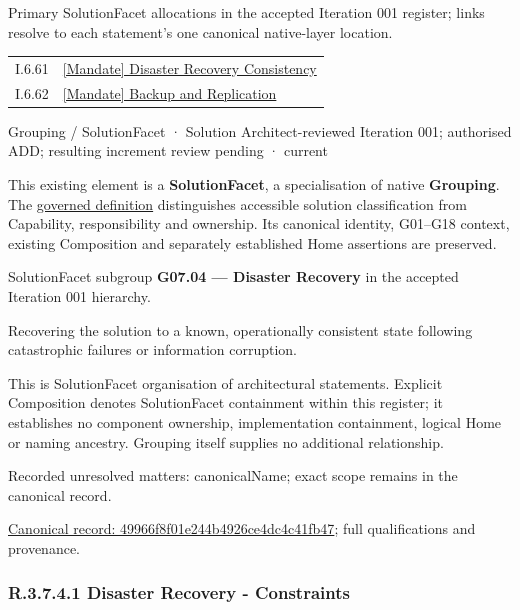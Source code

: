 Primary SolutionFacet allocations in the accepted Iteration 001 register; links resolve to each statement’s one canonical native-layer location.\par
\begin{longtable}{p{.22\linewidth}p{.73\linewidth}}
I.6.61 & \hyperref[element:81fdb5611a0f4338ae85478781032dd7]{[Mandate] Disaster Recovery Consistency} \\
I.6.62 & \hyperref[element:8731f88e202a4f5dacb408e5a1d474a8]{[Mandate] Backup and Replication} \\
\end{longtable}
\label{element:49966f8f01e244b4926ce4dc4c41fb47}
{\small Grouping / SolutionFacet · Solution Architect-reviewed Iteration 001; authorised ADD; resulting increment review pending · current}\par

This existing element is a \textbf{SolutionFacet}, a specialisation of native
\textbf{Grouping}. The \href{\detokenize{../../../../../../../governance/continuum-representation.md#solutionfacet-classification--1119-candidate}}{governed definition}
distinguishes accessible solution classification from Capability, responsibility
and ownership. Its canonical identity, G01–G18 context, existing Composition
and separately established Home assertions are preserved.



SolutionFacet subgroup \textbf{G07.04 — Disaster Recovery} in the accepted Iteration 001 hierarchy.



Recovering the solution to a known, operationally consistent state following catastrophic failures or information corruption.



This is SolutionFacet organisation of architectural statements. Explicit Composition denotes SolutionFacet containment within this register; it establishes no component ownership, implementation containment, logical Home or naming ancestry. Grouping itself supplies no additional relationship.


{\small Recorded unresolved matters: canonicalName; exact scope remains in the canonical record.}\par
{\footnotesize \href{../../../../../../../continuum/grouping/49966f8f01e244b4926ce4dc4c41fb47.md}{Canonical record: 49966f8f01e244b4926ce4dc4c41fb47}; full qualifications and provenance.}\par
\subsubsection*{R.3.7.4.1 Disaster Recovery - Constraints}
\label{navigation:R.3.7.4.1}

